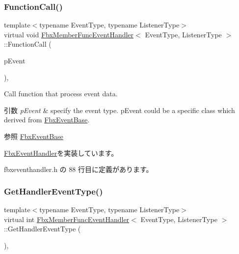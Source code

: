 \subsubsection{\texorpdfstring{Function\+Call()}{FunctionCall()}}
{\footnotesize\ttfamily template$<$typename Event\+Type, typename Listener\+Type$>$ \\
virtual void \hyperlink{class_fbx_member_func_event_handler}{Fbx\+Member\+Func\+Event\+Handler}$<$ Event\+Type, Listener\+Type $>$\+::Function\+Call (\begin{DoxyParamCaption}\item[{const \hyperlink{class_fbx_event_base}{Fbx\+Event\+Base} \&}]{p\+Event }\end{DoxyParamCaption})\hspace{0.3cm}{\ttfamily [inline]}, {\ttfamily [virtual]}}

Call function that process event data. 
\begin{DoxyParams}{引数}
{\em p\+Event} & specify the event type. p\+Event could be a specific class which derived from \hyperlink{class_fbx_event_base}{Fbx\+Event\+Base}. \\
\hline
\end{DoxyParams}
\begin{DoxySeeAlso}{参照}
\hyperlink{class_fbx_event_base}{Fbx\+Event\+Base} 
\end{DoxySeeAlso}


\hyperlink{class_fbx_event_handler_a46357ba45116a30c8f53c3e5fe9ba2fb}{Fbx\+Event\+Handler}を実装しています。



 fbxeventhandler.\+h の 88 行目に定義があります。

\mbox{\label{class_fbx_member_func_event_handler_a57856423663f283503e6498a7eacb0b4}} 
\subsubsection{\texorpdfstring{Get\+Handler\+Event\+Type()}{GetHandlerEventType()}}
{\footnotesize\ttfamily template$<$typename Event\+Type, typename Listener\+Type$>$ \\
virtual int \hyperlink{class_fbx_member_func_event_handler}{Fbx\+Member\+Func\+Event\+Handler}$<$ Event\+Type, Listener\+Type $>$\+::Get\+Handler\+Event\+Type (\begin{DoxyParamCaption}{ }\end{DoxyParamCaption})\hspace{0.3cm}{\ttfamily [inline]}, {\ttfamily [virtual]}}

